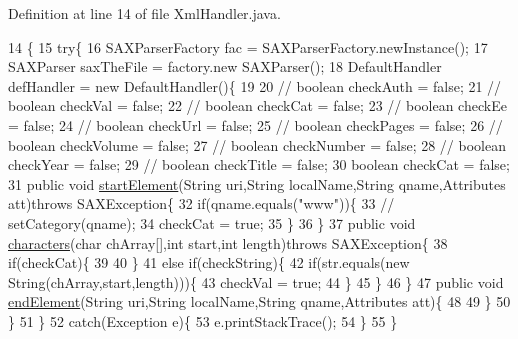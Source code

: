 Definition at line 14 of file Xml\-Handler.\-java.


\begin{DoxyCode}
14                                 \{
15         \textcolor{keywordflow}{try}\{
16             SAXParserFactory fac = SAXParserFactory.newInstance();
17             SAXParser saxTheFile = factory.new SAXParser();
18             DefaultHandler defHandler = \textcolor{keyword}{new} DefaultHandler()\{
19                 
20                 \textcolor{comment}{// boolean checkAuth = false;}
21                 \textcolor{comment}{// boolean checkVal = false;}
22                 \textcolor{comment}{// boolean checkCat = false;}
23                 \textcolor{comment}{// boolean checkEe = false;}
24                 \textcolor{comment}{// boolean checkUrl = false;}
25                 \textcolor{comment}{// boolean checkPages = false;}
26                 \textcolor{comment}{// boolean checkVolume = false;}
27                 \textcolor{comment}{// boolean checkNumber = false;}
28                 \textcolor{comment}{// boolean checkYear = false;}
29                 \textcolor{comment}{// boolean checkTitle = false;}
30                 \textcolor{keywordtype}{boolean} checkCat = \textcolor{keyword}{false};
31                 \textcolor{keyword}{public} \textcolor{keywordtype}{void} \hyperlink{classXmlHandlerAuthor_adac17a195135fb961bb4a8b932138152}{startElement}(String uri,String localName,String qname,Attributes 
      att)\textcolor{keywordflow}{throws} SAXException\{
32                     \textcolor{keywordflow}{if}(qname.equals(\textcolor{stringliteral}{"www"}))\{
33                         \textcolor{comment}{// setCategory(qname);}
34                         checkCat = \textcolor{keyword}{true};
35                     \}
36                 \}
37                 \textcolor{keyword}{public} \textcolor{keywordtype}{void} \hyperlink{classXmlHandlerAuthor_ad97c3844a098280d675ac0e703ac4e27}{characters}(\textcolor{keywordtype}{char} chArray[],\textcolor{keywordtype}{int} start,\textcolor{keywordtype}{int} length)\textcolor{keywordflow}{throws} SAXException\{
38                     \textcolor{keywordflow}{if}(checkCat)\{
39                         
40                     \}
41                     \textcolor{keywordflow}{else} \textcolor{keywordflow}{if}(checkString)\{
42                         \textcolor{keywordflow}{if}(str.equals(\textcolor{keyword}{new} String(chArray,start,length)))\{
43                             checkVal = \textcolor{keyword}{true};
44                         \}
45                     \}
46                 \}
47                 \textcolor{keyword}{public} \textcolor{keywordtype}{void} \hyperlink{classXmlHandlerAuthor_ae6175824e08db40f2862bd06297d6847}{endElement}(String uri,String localName,String qname,Attributes att)\{
48                     
49                 \}
50             \}
51         \}
52         \textcolor{keywordflow}{catch}(Exception e)\{
53             e.printStackTrace();
54         \}
55     \}
\end{DoxyCode}
